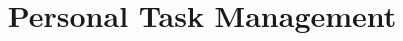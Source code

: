 \documentclass[twoside,final]{hcmut-report}
\title{Personal Task Management}
\begin{document}
\coverpage
\tableofcontents
\clearpage




\end{document}
